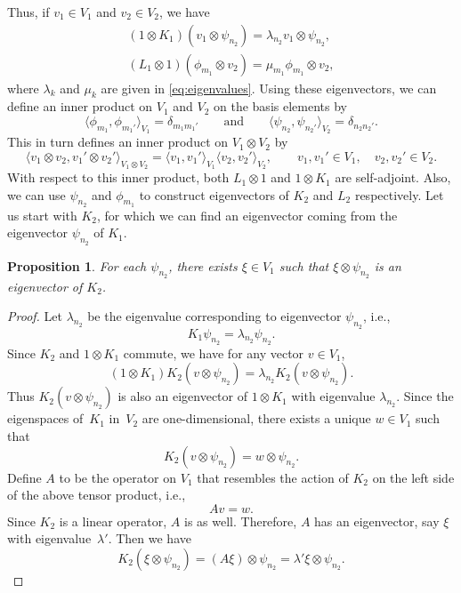 \documentclass[pdftex]{sigma}
\numberwithin{equation}{section}
\newtheorem{Proposition}[Theorem]{Proposition}
 { \theoremstyle{definition}
\newtheorem{Definition}[Theorem]{Definition}
\newtheorem{Note}[Theorem]{Note}
\newtheorem{Example}[Theorem]{Example}
\newtheorem{Remark}[Theorem]{Remark} }
\begin{document}
Thus, if $v_1\in V_1$ and $v_2\in V_2$, we have
\begin{gather*}
(1\otimes K_1)(v_1\otimes \psi_{n_2})=\lambda_{n_2}v_1\otimes \psi_{n_2},\\
(L_1\otimes 1)(\phi_{m_1}\otimes v_2)=\mu_{m_1} \phi_{m_1}\otimes v_2,
\end{gather*}
where $\lambda_k$ and $\mu_k$ are given in \eqref{eq:eigenvalues}.
Using these eigenvectors, we can define an inner product on $V_1$ and $V_2$ on the basis elements by
\[
\big\langle \phi_{m_1},\phi_{m_1'}\big\rangle_{V_1}=\delta_{m_1m_1'}\qquad \text{and}\qquad \big\langle \psi_{n_2},\psi_{n_2'}\big\rangle_{V_2}=\delta_{n_2n_2'}.
\]
This in turn defines an inner product on $V_1\otimes V_2$ by
\[
\langle v_1\otimes v_2,v_1'\otimes v_2'\rangle_{V_1\otimes V_2}= \langle v_1,v_1'\rangle_{V_1}\langle v_2,v_2'\rangle_{V_2},\qquad v_1,v_1'\in V_1, \quad v_2,v_2'\in V_2.
\]
With respect to this inner product, both $L_1\otimes 1$ and $1\otimes K_1$ are self-adjoint. Also, we can use $\psi_{n_2}$ and $\phi_{m_1}$ to construct eigenvectors of $K_2$ and $L_2$ respectively. Let us start with $K_2$, for which we can find an eigenvector coming from the eigenvector $\psi_{n_2}$ of $K_1$.
\begin{Proposition}
	For each $\psi_{n_2}$, there exists $\xi\in V_1$ such that $\xi\otimes \psi_{n_2}$ is an eigenvector of $K_2$.
\end{Proposition}
\begin{proof}
	Let $\lambda_{n_2}$ be the eigenvalue corresponding to eigenvector $\psi_{n_2}$, i.e.,
	\[
	K_1\psi_{n_2}=\lambda_{n_2}\psi_{n_2}.
	\]
	Since $K_2$ and $1\otimes K_1$ commute, we have for any vector $v\in V_1$,
	\[
	(1\otimes K_1)K_2 (v\otimes \psi_{n_2}) = \lambda_{n_2} K_2 (v\otimes \psi_{n_2}).
	\]
	Thus $K_2 (v\otimes \psi_{n_2})$ is also an eigenvector of $1\otimes K_1$ with eigenvalue $\lambda_{n_2}$. Since the eigenspaces of~$K_1$ in~$V_2$ are one-dimensional, there exists a unique $w\in V_1$ such that
	\[
	K_2 (v\otimes \psi_{n_2}) = w\otimes \psi_{n_2}.
	\]
	Define $A$ to be the operator on $V_1$ that resembles the action of $K_2$ on the left side of the above tensor product, i.e.,
	\[
	A v =w.
	\]
	Since $K_2$ is a linear operator, $A$ is as well. Therefore, $A$ has an eigenvector, say $\xi$ with eigenvalue~$\lambda'$. Then we have
	\[
	K_2 (\xi\otimes \psi_{n_2}) = (A\xi)\otimes \psi_{n_2} =\lambda'\xi\otimes \psi_{n_2}. \tag*{\qed}
	\]\renewcommand{\qed}{}
\end{proof}
\end{document}
